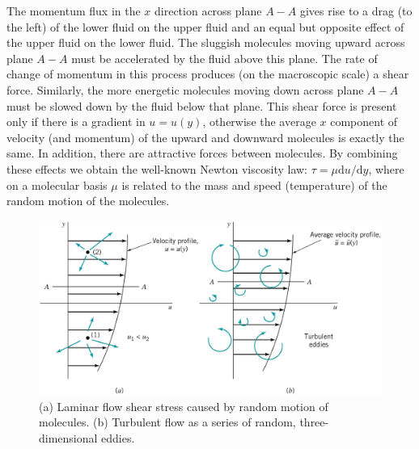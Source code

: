 \documentclass[12pt,a4paper]{article}
\newcommand{\dif}{\mathrm{d}}
\begin{document}
The momentum flux in the $x$ direction across plane $A-A$ gives rise to a drag (to the left) of the lower fluid on the upper fluid and an equal but opposite effect of the upper fluid on the lower fluid. The sluggish molecules moving upward across plane $A-A$ must be accelerated by the fluid above this plane. The rate of change of momentum in this process produces (on the macroscopic scale) a shear force. Similarly, the more energetic molecules moving down across plane $A-A$ must be slowed down by the fluid below that plane. This shear force is present only if there is a gradient in $u = u(y)$, otherwise the average $x$ component of velocity (and momentum) of the upward and downward molecules is exactly the same. In addition, there are attractive forces between molecules. By combining these effects we obtain the well-known Newton viscosity law: $\tau = \mu \dif u/\dif y$, where on a molecular basis $\mu$ is related to the mass and speed (temperature) of the random motion of the molecules.

\begin{figure}
\centering
\includegraphics[height=8.cm, angle=0]{flow.eps}
\caption{
(a) Laminar flow shear stress caused by random motion of molecules. (b) Turbulent flow as a series of random, three-dimensional eddies.
}
\label{fig:flow}
\end{figure}
\end{document}
